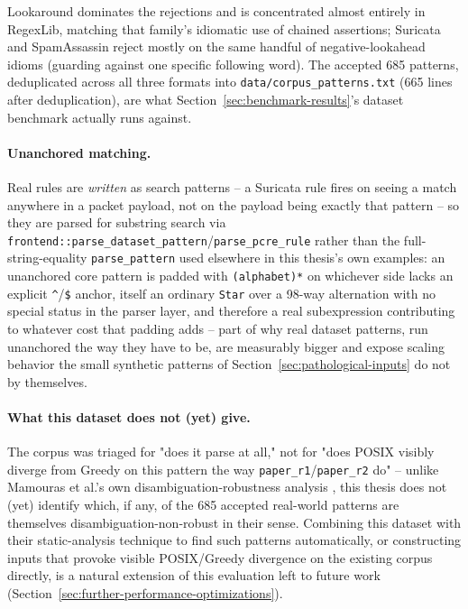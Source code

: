 Lookaround dominates the rejections and is concentrated almost entirely
in RegexLib, matching that family's idiomatic use of chained
assertions; Suricata and SpamAssassin reject mostly on the same handful
of negative-lookahead idioms (guarding against one specific following
word). The accepted 685 patterns, deduplicated across all three formats
into \texttt{data/corpus\_patterns.txt} (665 lines after deduplication),
are what Section~\ref{sec:benchmark-results}'s dataset benchmark
actually runs against.

\paragraph{Unanchored matching.} Real rules are \emph{written} as
search patterns -- a Suricata rule fires on seeing a match anywhere in a
packet payload, not on the payload being exactly that pattern -- so they
are parsed for substring search via
\texttt{frontend::parse\_dataset\_pattern}/\texttt{parse\_pcre\_rule}
rather than the full-string-equality \texttt{parse\_pattern} used
elsewhere in this thesis's own examples: an unanchored core pattern is
padded with \texttt{(alphabet)*} on whichever side lacks an explicit
\texttt{\^{}}/\texttt{\$} anchor, itself an ordinary \texttt{Star} over
a 98-way alternation with no special status in the parser layer, and
therefore a real subexpression contributing to whatever cost that
padding adds -- part of why real dataset patterns, run unanchored the
way they have to be, are measurably bigger and expose scaling behavior
the small synthetic patterns of Section~\ref{sec:pathological-inputs}
do not by themselves.

\paragraph{What this dataset does not (yet) give.} The corpus was
triaged for "does it parse at all," not for "does POSIX visibly diverge
from Greedy on this pattern the way \texttt{paper\_r1}/\texttt{paper\_r2}
do" -- unlike Mamouras et al.'s own disambiguation-robustness analysis
\citep{mamouras2024}, this thesis does not (yet) identify which, if any,
of the 685 accepted real-world patterns are themselves
disambiguation-non-robust in their sense. Combining this dataset with
their static-analysis technique to find such patterns automatically, or
constructing inputs that provoke visible POSIX/Greedy divergence on the
existing corpus directly, is a natural extension of this evaluation left
to future work (Section~\ref{sec:further-performance-optimizations}).



